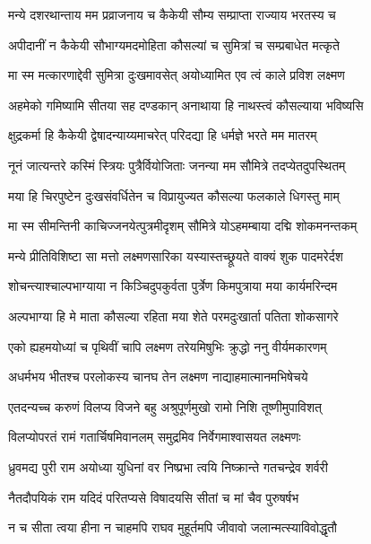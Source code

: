 \twolineshloka
{मन्ये दशरथान्ताय मम प्रव्राजनाय च}
{कैकेयी सौम्य सम्प्राप्ता राज्याय भरतस्य च} %

\twolineshloka
{अपीदानीं न कैकेयी सौभाग्यमदमोहिता}
{कौसल्यां च सुमित्रां च सम्प्रबाधेत मत्कृते} %

\twolineshloka
{मा स्म मत्कारणाद्देवी सुमित्रा दुःखमावसेत्}
{अयोध्यामित एव त्वं काले प्रविश लक्ष्मण} %

\twolineshloka
{अहमेको गमिष्यामि सीतया सह दण्डकान्}
{अनाथाया हि नाथस्त्वं कौसल्याया भविष्यसि} %

\twolineshloka
{क्षुद्रकर्मा हि कैकेयी द्वेषादन्याय्यमाचरेत्}
{परिदद्या हि धर्मज्ञे भरते मम मातरम्} %

\twolineshloka
{नूनं जात्यन्तरे कस्मिं स्त्रियः पुत्रैर्वियोजिताः}
{जनन्या मम सौमित्रे तदप्येतदुपस्थितम्} %

\twolineshloka
{मया हि चिरपुष्टेन दुःखसंवर्धितेन च}
{विप्रायुज्यत कौसल्या फलकाले धिगस्तु माम्} %

\twolineshloka
{मा स्म सीमन्तिनी काचिज्जनयेत्पुत्रमीदृशम्}
{सौमित्रे योऽहमम्बाया दद्मि शोकमनन्तकम्} %

\twolineshloka
{मन्ये प्रीतिविशिष्टा सा मत्तो लक्ष्मणसारिका}
{यस्यास्तच्छ्रूयते वाक्यं शुक पादमरेर्दश} %

\twolineshloka
{शोचन्त्याश्चाल्पभाग्याया न किञ्चिदुपकुर्वता}
{पुर्त्रेण किमपुत्राया मया कार्यमरिन्दम} %

\twolineshloka
{अल्पभाग्या हि मे माता कौसल्या रहिता मया}
{शेते परमदुःखार्ता पतिता शोकसागरे} %

\twolineshloka
{एको ह्यहमयोध्यां च पृथिवीं चापि लक्ष्मण}
{तरेयमिषुभिः क्रुद्धो ननु वीर्यमकारणम्} %

\twolineshloka
{अधर्मभय भीतश्च परलोकस्य चानघ}
{तेन लक्ष्मण नाद्याहमात्मानमभिषेचये} %

\twolineshloka
{एतदन्यच्च करुणं विलप्य विजने बहु}
{अश्रुपूर्णमुखो रामो निशि तूष्णीमुपाविशत्} %

\twolineshloka
{विलप्योपरतं रामं गतार्चिषमिवानलम्}
{समुद्रमिव निर्वेगमाश्वासयत लक्ष्मणः} %

\twolineshloka
{ध्रुवमद्य पुरी राम अयोध्या युधिनां वर}
{निष्प्रभा त्वयि निष्क्रान्ते गतचन्द्रेव शर्वरी} %

\twolineshloka
{नैतदौपयिकं राम यदिदं परितप्यसे}
{विषादयसि सीतां च मां चैव पुरुषर्षभ} %

\twolineshloka
{न च सीता त्वया हीना न चाहमपि राघव}
{मुहूर्तमपि जीवावो जलान्मत्स्याविवोद्धृतौ} %

